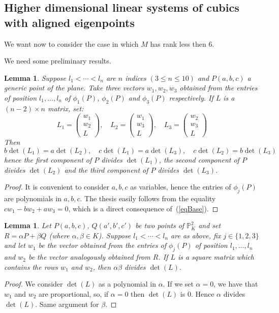 \documentclass{amsart}
\theoremstyle{plain}
\newtheorem{lemma}[theorem]{Lemma}
\theoremstyle{definition}
\begin{document}
\subsection{Higher dimensional linear systems of cubics with aligned eigenpoints}
We want now to consider the case in which $M$ has rank less then $6$.

We need some preliminary results.

\begin{lemma} Suppose $l_1< \cdots <l_n$ are
  $n$ indices $(3 \leq n \leq 10)$ and $P(a, b, c)$ a generic point of
  the plane. Take three vectors $w_1, w_2, w_3$
  obtained from the entries of position $l_1, \dots, l_n$
  of $\phi_1(P)$, $\phi_2(P)$ and $\phi_3(P)$ respectively.
  If $L$ is a $(n-2) \times n$ matrix, set:
  \[
  L_1 = \left(\begin{array}{c}w_1 \\ w_2 \\ L\end{array}  \right), \quad
  L_2 = \left(\begin{array}{c}w_1 \\ w_3 \\ L\end{array}  \right), \quad
  L_3 = \left(\begin{array}{c}w_2 \\ w_3 \\ L\end{array}  \right)
  \]
  Then
  \[
  b \det(L_1) = a \det(L_2), \quad  
  c \det(L_1) = a \det(L_3), \quad  
  c \det(L_2) = b \det(L_3)
  \]
  hence the first component of $P$ divides $\det(L_1)$, the second
  component of $P$ divides $\det(L_2)$ and the third component of
  $P$ divides $\det(L_3)$.
  \label{lemma1}
\end{lemma}
\begin{proof} It is convenient to consider $a, b, c$ as variables, hence
  the entries of $\phi_j(P)$ are polynomials in $a, b, c$.
  The thesis easily follows from the equality $c w_1-b w_2+a w_3 = 0$, which
  is a direct consequence of~(\ref{eqBase}). 
\end{proof}

\begin{lemma}
  Let $P(a, b, c)$, $Q(a', b', c')$ be two points of $\mathbb{P}^2_K$
  and set $R = \alpha P+\beta Q$ (where $\alpha, \beta \in K$). 
  Suppose $l_1 < \cdots < l_n$ are as above, fix $j \in \{1, 2, 3\}$
  and   let $w_1$ be the vector obtained
  from the entries of $\phi_j(P)$ of position $l_1, \dots, l_n$ 
  and $w_2$ be the vector analogously obtained from $R$. If 
  $L$ is a square matrix which contains the
  rows $w_1$ and $w_2$, then $\alpha\beta$ divides $\det(L)$.
  \label{lemma2}
\end{lemma}
\begin{proof}
  We consider $\det(L)$ as a polynomial in $\alpha$.
  If we set $\alpha = 0$,
  we have that $w_1$ and $w_2$ are proportional, so, if $\alpha = 0$
  then $\det(L)$ is $0$. Hence $\alpha$ divides $\det(L)$. Same
  argument for $\beta$. 
\end{proof}
\end{document}

